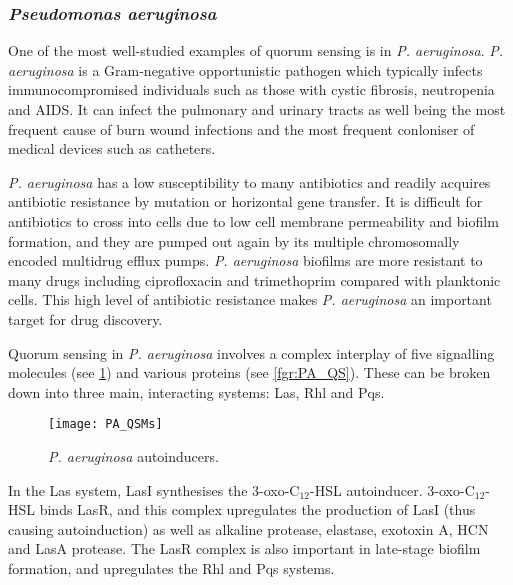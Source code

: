 \subsubsection{\textit{Pseudomonas aeruginosa}\label{sec:PA}}

One of the most well-studied examples of quorum sensing is in \textit{P. aeruginosa}\cite{Dubern2008,Hodgkinson2011,Jimenez2012}.
\textit{P. aeruginosa} is a Gram-negative opportunistic pathogen which typically infects immunocompromised individuals such as those with cystic fibrosis, neutropenia and AIDS. It can infect the pulmonary and urinary tracts as well being the most frequent cause of burn wound infections and the most frequent conloniser of medical devices such as catheters\cite{Bodey1983}.

\textit{P. aeruginosa} has a low susceptibility to many antibiotics and readily acquires antibiotic resistance by mutation or horizontal gene transfer\cite{Cornelis2008}.
It is difficult for antibiotics to cross into cells due to low cell membrane permeability\cite{Nikaido1989} and biofilm formation\cite{Evans1991}, and they are pumped out again by its multiple chromosomally encoded multidrug efflux pumps\cite{Poole2004}.
\textit{P. aeruginosa} biofilms are more resistant to many drugs including ciprofloxacin  and trimethoprim  compared with planktonic cells\cite{Evans1991,Olson2002}.
This high level of antibiotic resistance makes \textit{P. aeruginosa} an important target for drug discovery.

Quorum sensing in \textit{P. aeruginosa} involves a complex interplay of five signalling molecules (see \ref{fgr:PA_autoinducers}) and various proteins (see \ref{fgr:PA_QS})\cite{Dubern2008,Hodgkinson2011,Jimenez2012}.
These can be broken down into three main, interacting systems: Las, Rhl and Pqs.

\begin{figure}[H]
	\begin{center}
		\texttt{[image: PA\_QSMs]}
		\caption{\textit{P. aeruginosa} autoinducers. \label{fgr:PA_autoinducers}}
	\end{center}
\end{figure}

In the Las system, LasI\cite{Wargo2007} synthesises the 3-oxo-C$_{12}$-HSL \cite{Pearson1994} autoinducer. 
3-oxo-C$_{12}$-HSL  binds LasR\cite{Gambello1991}, and this complex upregulates the production of LasI\cite{Pesci1997} (thus causing autoinduction) as well as 
alkaline protease\cite{Gambello1993}, elastase\cite{Gambello1991}, exotoxin A\cite{Gambello1993}, HCN\cite{Pessi2000} and LasA protease\cite{Toder1991}.
The LasR complex is also important in late-stage biofilm formation\cite{Sauer2002}, and upregulates the Rhl\cite{Latifi1996} and Pqs systems\cite{Gallagher2002,Wade2005}.

